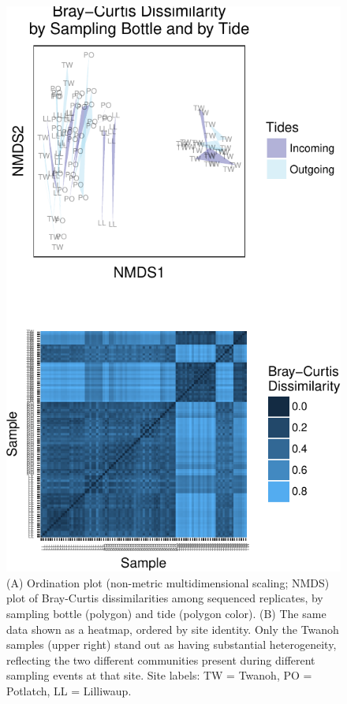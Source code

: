 \documentclass[fleqn,10pt,lineno]{wlpeerj} %
\begin{document}
\begin{figure}

{\centering \includegraphics{figures/multiplot_NMDS_BottleTide-1} 

}

\caption{\label{fig:fig3}(A) Ordination plot (non-metric multidimensional scaling; NMDS) plot of Bray-Curtis dissimilarities among sequenced replicates, by sampling bottle (polygon) and tide (polygon color). (B) The same data shown as a heatmap, ordered by site identity. Only the Twanoh samples (upper right) stand out as having substantial heterogeneity, reflecting the two different communities present during different sampling events at that site. Site labels: TW = Twanoh, PO = Potlatch, LL = Lilliwaup.}\label{fig:multiplot_NMDS_BottleTide}
\end{figure}
\end{document}
